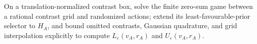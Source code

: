 On a translation-normalized contrast box, solve the finite zero-sum game between a rational contrast grid and randomized actions; extend its least-favourable-prior selector to \(H_A\), and bound omitted contrasts, Gaussian quadrature, and grid interpolation explicitly to compute \(L_\varepsilon(v_A,r_A)\) and \(U_\varepsilon(v_A,r_A)\).